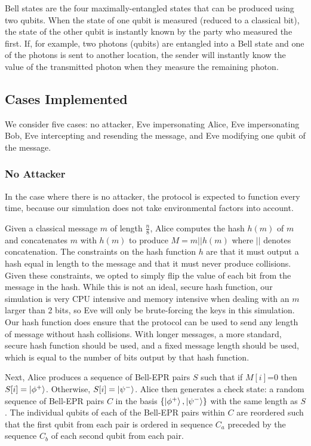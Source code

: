 \documentclass[conference,compsoc]{IEEEtran}
\begin{document}
Bell states are the four maximally-entangled states that can be produced
using two qubits. When the state of one qubit is measured (reduced
to a classical bit), the state of the other qubit is instantly known
by the party who measured the first. If, for example, two photons (qubits)
are entangled into a Bell state and one of the photons is sent to
another location, the sender will instantly know the value of the
transmitted photon when they measure the remaining photon. 

\subsection{Cases Implemented}

We consider five cases: no attacker, Eve impersonating Alice, Eve
impersonating Bob, Eve intercepting and resending the message, and Eve
modifying one qubit of the message.

\subsubsection{No Attacker}

In the case where there is no attacker, the protocol is expected
to function every time, because our simulation does not take environmental
factors into account.

Given a classical message $m$ of length $\frac{n}{8}$, Alice computes
the hash $h(m)$ of $m$ and concatenates $m$ with $h(m)$ to produce $M=m||h(m)$ where
$||$ denotes concatenation. The constraints
on the hash function $h$ are that it must output a hash equal in
length to the message and that it must never produce collisions. Given
these constraints, we opted to simply flip the value of each
bit from the message in the hash. While this is not an ideal, secure hash function,
our simulation is very CPU intensive and memory intensive when dealing with an $m$ larger
than 2 bits, so Eve will only be brute-forcing the keys in this simulation.
Our hash function does ensure that the protocol can be used to send any
length of message without hash collisions.
With longer messages, a more standard, secure hash function should be used, and a fixed message length
should be used, which is equal to the number of bits output by that hash function.

Next, Alice produces a sequence of Bell-EPR pairs $S$ such that if $M[i]$=0 then $S[i]=\ket{\phi^{+}} $.
Otherwise, $S[i]=\ket{\psi^{-}} $. Alice then generates
a check state: a random sequence of Bell-EPR pairs $C$ in the basis $\left\{ \ket{\phi^{+}} ,\ket{\psi^{-}} \right\} $
with the same length as $S$. The individual qubits of each of the Bell-EPR pairs within $C$ are reordered such that
the first qubit from each pair is ordered in sequence $C_{a}$ preceded by the sequence $C_{b}$ of each second
qubit from each pair.
\end{document}
